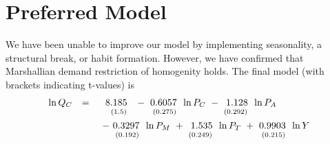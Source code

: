 \documentclass[12pt]{article}
\begin{document}


\section{Preferred Model} %
\label{sec:preferred_model_interpretation}
We have been unable to improve our model by implementing seasonality, a structural break, or habit formation. However, we have confirmed that Marshallian demand restriction of homogenity holds. The final model (with brackets indicating t-values) is 
\begin{equation*}
\begin{array}{lcl}
\ln Q_C & = & 
\ \!\begin{array}[t]{r}
8.185
\\ ^{(1.5)}
\end{array}
\ -\!\begin{array}[t]{r}
0.6057
\\ ^{(0.275)}
\end{array}
\ln P_C
\ -\!\begin{array}[t]{r}
1.128
\\ ^{(0.292)}
\end{array}
\ln P_A
\\ & &
\ -\!\begin{array}[t]{r}
0.3297
\\ ^{(0.192)}
\end{array}
\ln P_M
\ +\!\begin{array}[t]{r}
1.535
\\ ^{(0.249)}
\end{array}
\ln P_T
\ +\!\begin{array}[t]{r}
0.9903
\\ ^{(0.215)}
\end{array}
\ln Y
\end{array}
\end{equation*}
\end{document}
